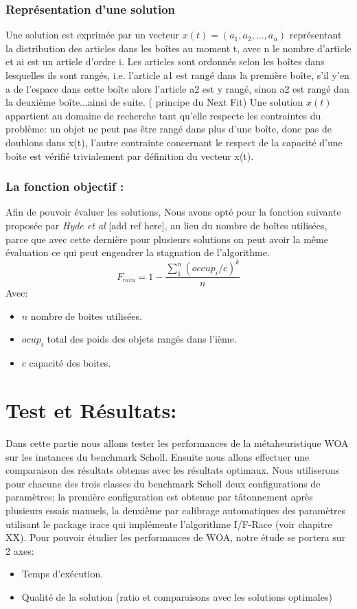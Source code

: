 \documentclass[12pt]{article}
\begin{document}
\subsubsection{Représentation d’une solution }
Une solution est exprimée par un vecteur $ x(t)=(a_1, a_2, …, a_n)$ représentant la distribution des articles dans les boîtes au moment t, avec n le nombre d’article et ai est un article d’ordre i. Les articles sont ordonnés selon les boîtes dans lesquelles ils sont rangés, i.e. l’article a1 est rangé dans la première boîte, s’il y’en a de l’espace dans cette boîte alors l’article a2 est y rangé, sinon a2 est rangé dan la deuxième boîte...ainsi de suite. ( principe du Next Fit) 
Une solution \(x(t)\) appartient au domaine de recherche tant qu’elle respecte les contraintes du problème: un objet ne peut pas être rangé dans plus d’une boîte, donc pas de doublons dans x(t), l’autre contrainte concernant le respect de la capacité d’une boîte est vérifié trivialement par définition du vecteur x(t).

\subsubsection{La fonction objectif :}
Afin de pouvoir évaluer les solutions, Nous avons opté pour la fonction suivante proposée par \emph{Hyde et al} [add ref here], au lieu du nombre de boîtes utilisées, parce que avec cette dernière pour plusieurs solutions on peut avoir la même évaluation ce qui peut engendrer la stagnation de l’algorithme.
\[ F_{min} = 1 - \frac{\sum_{1}^{n} (occup_i / c)^k}{n}\]
Avec:
\begin{itemize}
    \item \(n\) nombre de boites utilisées.
    \item \(ocup_i\) total des poids des objets rangés dans l’ième.
    \item \(c\) capacité des boites.
    
\end{itemize}
\section{Test et Résultats: }
Dans cette partie nous allons tester les performances de la métaheuristique WOA sur les instances du benchmark Scholl. Ensuite nous allons effectuer une comparaison des résultats obtenus avec les résultats optimaux. Nous utiliserons pour chacune des trois classes du benchmark Scholl deux configurations de paramètres; la première configuration est obtenue par tâtonnement après plusieurs essais manuels, la deuxième par calibrage automatiques des paramètres utilisant le package irace qui implémente l’algorithme I/F-Race (voir chapitre XX).
Pour pouvoir étudier les performances de WOA, notre étude se portera sur 2 axes:
\begin{itemize}
    \item Temps d'exécution.
    \item Qualité de la solution  (ratio et comparaisons avec les solutions optimales)
\end{itemize}
\end{document}
